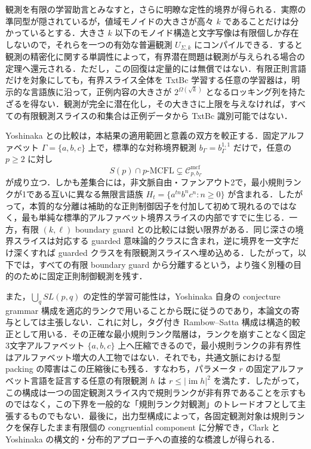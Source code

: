 \documentclass[11pt,a4paper]{ltjsarticle}
\numberwithin{equation}{section}
\theoremstyle{plain}
\theoremstyle{definition}
\theoremstyle{remark}
\newcommand{\Cmcf}[2]{\mathcal{C}^{\mathrm{mcf}}_{#1,#2}}
\begin{document}
観測を有限の学習助言とみなすと，さらに明瞭な定性的境界が得られる．実際の準同型が隠されているが，値域モノイドの大きさが高々 $k$ であることだけは分かっているとする．大きさ $k$ 以下のモノイド構造と文字写像は有限個しか存在しないので，それらを一つの有効な普遍観測 $U_{\Sigma,k}$ にコンパイルできる．すると観測の精密化に関する単調性によって，有界潜在問題は観測が与えられる場合の定理へ還元される．ただし，この回復は定量的には無償ではない．有限正則言語だけを対象にしても，有界スライス全体を TxtBc 学習する任意の学習器は，明示的な言語族に沿って，正例内容の大きさが $2^{\Omega(\sqrt{k})}$ となるロッキング列を持たざるを得ない．観測が完全に潜在化し，その大きさに上限を与えなければ，すべての有限観測スライスの和集合は正例データから TxtBc 識別可能ではない．

Yoshinaka との比較は，本結果の適用範囲と意義の双方を較正する．固定アルファベット $\Gamma=\{a,b,c\}$ 上で，標準的な対称境界観測 $b_\Gamma=b_\Gamma^{1,1}$ だけで，任意の $p\ge2$ に対し
\[
  S(p)\cap p\text{-}\mathrm{MCFL}
  \subsetneq
  \Cmcf{p}{b_\Gamma}
\]
が成り立つ．しかも差集合には，非文脈自由・ファンアウト2で，最小規則ランクが1である互いに異なる無限言語族
$H_t=\{a^{tn}b^nc^n:n\ge0\}$ が含まれる．したがって，本質的な分離は補助的な正則制御因子を付加して初めて現れるのではなく，最も単純な標準的アルファベット境界スライスの内部ですでに生じる．一方，有限 $(k,\ell)$ boundary guard との比較には鋭い限界がある．同じ深さの境界スライスは対応する guarded 意味論的クラスに含まれ，逆に境界を一文字だけ深くすれば guarded クラスを有限観測スライスへ埋め込める．したがって，以下では，すべての有限 boundary guard から分離するという，より強く別種の目的のために固定正則制御観測を残す．

また，$\bigcup_q SL(p,q)$ の定性的学習可能性は，Yoshinaka 自身の conjecture grammar 構成を適応的ランクで用いることから既に従うのであり，本論文の寄与としては主張しない．これに対し，タグ付き Rambow--Satta 構成は構造的較正として用いる．その正確な最小規則ランク階層は，ランクを崩すことなく固定3文字アルファベット $\{a,b,c\}$ 上へ圧縮できるので，最小規則ランクの非有界性はアルファベット増大の人工物ではない．それでも，共通文脈における型 packing の障害はこの圧縮後にも残る．すなわち，パラメータ $r$ の固定アルファベット言語を証言する任意の有限観測 $h$ は
$r\le |\operatorname{im}h|^2$ を満たす．したがって，この構成は一つの固定観測スライス内で規則ランクが非有界であることを示すものではなく，この下界を一般的な「規則ランク対観測」のトレードオフとして主張するものでもない．最後に，出力型構成によって，各固定観測対象は規則ランクを保存したまま有限個の congruential component に分解でき，Clark と Yoshinaka の構文的・分布的アプローチへの直接的な橋渡しが得られる．
\end{document}
